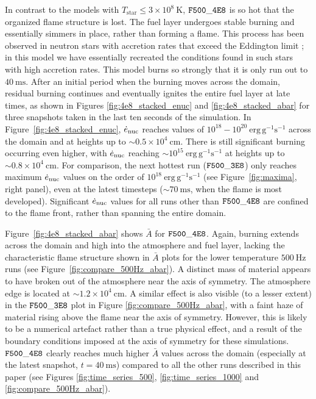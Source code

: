 \documentclass[preprint,times,tighten]{aastex63}
\newcommand{\enucdot}{\dot{e}_{\rm nuc}}
\begin{document}
In contrast to the models with $T_{\mathrm{star}} \leq 3 \times 10^8~\mathrm{K}$, $\tt{F500\_4E8}$ 
is so hot that the organized flame structure is lost. The fuel layer undergoes stable burning and 
essentially simmers in place, rather than forming a flame. This process has been observed in 
neutron stars with accretion rates that exceed the Eddington limit 
\citep{fujimoto1981,bildsten1998thermonuclear,keek2009effect}; in this model we have essentially 
recreated the conditions found in such stars with high accretion rates. This model burns so 
strongly that it is only run out to $40~\mathrm{ms}$. After an initial period when the burning 
moves across the domain, residual burning continues and eventually ignites the entire fuel layer at 
late times, as shown in Figures \ref{fig:4e8_stacked_enuc} and \ref{fig:4e8_stacked_abar} for three 
snapshots taken in the last ten seconds of the simulation. In Figure~\ref{fig:4e8_stacked_enuc}, 
$\enucdot$ reaches values of $10^{18} - 10^{20}~\mathrm{erg}\,\mathrm{g}^{-1} \mathrm{s}^{-1}$ 
across the domain and at heights up to $\sim 0.5\times 10^4~\mathrm{cm}$. There is still 
significant burning occurring even higher, with $\enucdot$ reaching $\sim 
10^{15}~\mathrm{erg}\,\mathrm{g}^{-1} \mathrm{s}^{-1}$ at heights up to $\sim 0.8\times 
10^4~\mathrm{cm}$. For comparison, the next hottest run ($\tt{F500\_3E8}$) only reaches maximum 
$\enucdot$ values on the order of $10^{18}~\mathrm{erg}\,\mathrm{g}^{-1} \mathrm{s}^{-1}$ 
(see Figure~\ref{fig:maxima}, right panel), even at the latest timesteps ($\sim 
70~\mathrm{ms}$, when the flame is most developed). Significant $\enucdot$ values for 
all runs other than $\tt{F500\_4E8}$ are confined to the flame front, rather than spanning the entire domain.

Figure~\ref{fig:4e8_stacked_abar} shows $\bar{A}$ for $\tt{F500\_4E8}$. Again, burning extends 
across the domain and high into the atmosphere and fuel layer, lacking the characteristic flame 
structure shown in $\bar{A}$ plots for the lower temperature $500~\mathrm{Hz}$ runs (see 
Figure~\ref{fig:compare_500Hz_abar}). A distinct mass of material appears to have broken out of the 
atmosphere near the axis of symmetry. The atmosphere edge is located at $\sim 1.2\times 
10^4~\mathrm{cm}$. A similar effect is also visible (to a lesser extent) in the $\tt{F500\_3E8}$ 
plot in Figure \ref{fig:compare_500Hz_abar}, with a faint haze of material rising above the flame near the axis of symmetry. 
However, this is likely to be a numerical artefact rather than a true physical effect, and a result 
of the boundary conditions imposed at the axis of symmetry for these simulations. $\tt{F500\_4E8}$ 
clearly reaches much higher $\bar{A}$ values across the domain (especially at the latest snapshot, 
$t = 40~\mathrm{ms}$) compared to all the other runs described in this paper (see Figures 
\ref{fig:time_series_500}, \ref{fig:time_series_1000} and \ref{fig:compare_500Hz_abar}). 
\end{document}
